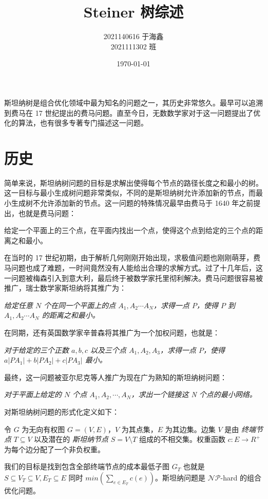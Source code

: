 \documentclass[cyan,normal,cn]{elegantnote}
\title{Steiner 树综述}
\date{\today}
\begin{document}
\author{
    2021140616 于海鑫 \\
	2021111302 班
}
\maketitle

斯坦纳树是组合优化领域中最为知名的问题之一，其历史非常悠久。最早可以追溯到费马在 17 世纪提出的费马问题。直至今日，无数数学家对于这一问题提出了优化的算法，也有很多专著专门描述这一问题。

\section{历史}

简单来说，斯坦纳树问题的目标是求解出使得每个节点的路径长度之和最小的树。这一目标与最小生成树问题非常类似，不同的是斯坦纳树允许添加新的节点，而最小生成树不允许添加新的节点。这一问题的特殊情况最早由费马于 1640 年之前提出，也就是费马问题：

给定一个平面上的三个点，在平面内找出一个点，使得这个点到给定的三个点的距离之和最小。

在当时的 17 世纪初期，由于解析几何刚刚开始出现，求极值问题也刚刚萌芽，费马问题也成了难题，一时间竟然没有人能给出合理的求解方式。过了十几年后，这一问题被梅森引入到意大利，最后终于被数学家托里彻利解决。费马问题很容易被推广，瑞士数学家斯坦纳将其推广为：

\textit{给定任意 $N$ 个在同一个平面上的点 $A_1, A_2 \cdots A_N$，求得一点 $P$，使得 $P$ 到 $A_1, A_2 \cdots A_N$ 的距离之和最小。}

在同期，还有英国数学家辛普森将其推广为一个加权问题，也就是：

\textit{对于给定的三个正数 $a, b, c$ 以及三个点 $A_1, A_2, A_3$，求得一点 $P$，使得 $a|PA_1| + b|PA_2| + c|PA_3|$ 最小。}

最终，这一问题被亚尔尼克等人推广为现在广为熟知的斯坦纳树问题：

\textit{对于平面上给定的 $N$ 个点 $A_1, A_2, \cdots, A_N$，求出一个链接这 N 个点的最小网络。}

对斯坦纳树问题的形式化定义如下：

令 $G$ 为无向有权图 $G=(V,E)$，$V$ 为其点集，$E$ 为其边集。边集 $V$ 是由 \textit{终端节点} $T \subseteq V$ 以及潜在的 \textit{斯坦纳节点} $S=V \setminus T$ 组成的不相交集。权重函数 $c \colon E \rightarrow R^{+}$ 为每个边分配了一个非负权重。

我们的目标是找到包含全部终端节点的成本最低子图 $G_T$ 也就是 $S \subseteq V_T \subseteq V, E_T \subseteq E$ 同时 $min(\sum_{e \in E_T} c(e))$。斯坦纳问题是 $\mathcal{NP}$-hard 的组合优化问题。
\end{document}
